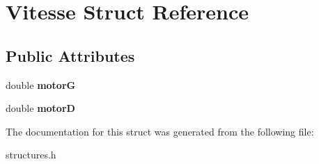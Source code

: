 \hypertarget{struct_vitesse}{}\section{Vitesse Struct Reference}
\label{struct_vitesse}
\subsection*{Public Attributes}
\begin{DoxyCompactItemize}
\item 
double {\bfseries motorG}\hypertarget{struct_vitesse_a98d077010cc73824784e494b23de1459}{}\label{struct_vitesse_a98d077010cc73824784e494b23de1459}

\item 
double {\bfseries motorD}\hypertarget{struct_vitesse_a8d32cbd41e826948a853243fe713a20b}{}\label{struct_vitesse_a8d32cbd41e826948a853243fe713a20b}

\end{DoxyCompactItemize}


The documentation for this struct was generated from the following file\+:\begin{DoxyCompactItemize}
\item 
structures.\+h\end{DoxyCompactItemize}
